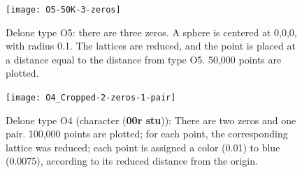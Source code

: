 \documentclass[preprint]{iucr}              %
\newcommand{\charseq}[1]{({\bf #1})}
\begin{document}
	\begin{figure}
		\caption{Delone type O5: there are three zeros. A sphere 
			is centered at 0,0,0, with radius 0.1. The lattices are 
			reduced, and the point is 
			placed at a distance equal to the distance from type O5. 50,000
			points are plotted.}
		\label{fig:O5}
		\texttt{[image: O5-50K-3-zeros]}
	\end{figure}
	
	\begin{figure}
		\caption{Delone type O4 (character \charseq{00r stu}): There are two zeros and one pair.			 
			100,000 points are plotted; for each
			 point, the corresponding lattice was reduced; each point
			is assigned a color (0.01) to blue (0.0075),
			according to its reduced distance from the origin.}
		\label{fig:O4}
		\texttt{[image: O4\_Cropped-2-zeros-1-pair]}
	\end{figure}
	
\end{document}
